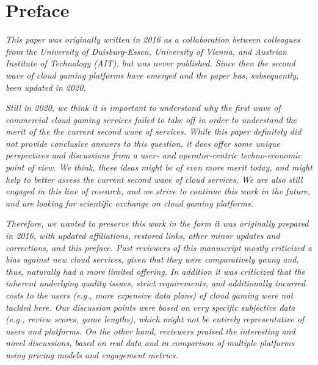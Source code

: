 \section*{Preface}


\textit{This paper was originally written in 2016 as a collaboration between colleagues from the University of Duisburg-Essen, University of Vienna, and Austrian Institute of Technology (AIT), but was never published. Since then the second wave of cloud gaming platforms have emerged and the paper has, subsequently, been updated in 2020.}

\textit{Still in 2020, we think it is important to understand why the first wave of commercial cloud gaming services failed to take off in order to understand the merit of the the current second wave of services. 
While this paper definitely did not provide conclusive answers to this question, it does offer some unique perspectives and discussions from a user- and operator-centric techno-economic point of view.
We think, these ideas might be of even more merit today, and might help to better assess the current second wave of cloud services. We are also still engaged in this line of research, and we strive to continue this work in the future, and are looking for scientific exchange on cloud gaming platforms.} 

\textit{
Therefore, we wanted to preserve this work in the form it was originally prepared in 2016, with updated affiliations, restored links, other minor updates and corrections, and this preface. Past reviewers of this manuscript mostly criticized a bias against new cloud services, given that they were comparatively young and, thus, naturally had a more limited offering. In addition it was criticized that the inherent underlying quality issues, strict requirements, and additionally incurred costs to the users (e.g., more expensive data plans) of cloud gaming were not tackled here. Our discussion points were based on very specific subjective data (e.g., review scores, game lengths), which might not be entirely representative of users and platforms.
On the other hand, reviewers praised the interesting and novel discussions, based on real data and in comparison of multiple platforms using pricing models and engagement metrics.}
